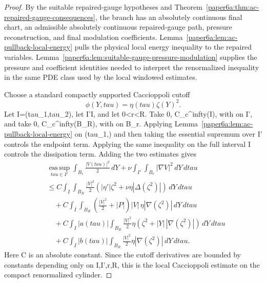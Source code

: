 \documentclass[11pt]{amsart}
\def\({}%
\def\){}%
\def\tau{tau}%
\def\infty{infty}%
\theoremstyle{plain}
\theoremstyle{definition}
\theoremstyle{remark}
\begin{document}
\begin{proof}
By the suitable repaired-gauge hypotheses and
Theorem~\ref{paper6a:thm:ac-repaired-gauge-consequences}, the branch has an
absolutely continuous final chart, an admissible absolutely continuous
repaired-gauge path, pressure reconstruction, and final modulation
coefficients.  Lemma~\ref{paper6a:lem:ac-pullback-local-energy} pulls the physical
local energy inequality to the repaired variables.
Lemma~\ref{paper6a:lem:suitable-gauge-pressure-modulation} supplies the pressure and
coefficient identities needed to interpret the renormalized inequality in the
same PDE class used by the local windowed estimates.

Choose a standard compactly supported Caccioppoli cutoff
\[
  \phi(Y,\tau)=\eta(\tau)\zeta(Y)^2.
\]
Let \(I=(\tau_1,\tau_2)\), let \(I'\Subset I\), and let
\(0<r<R\).  Take \(0\le\eta{}\), \(\eta\in C_c^\infty(I)\), with
\(\eta{}\) on \(I'\), and take \(0\le\zeta{}\),
\(\zeta\in C_c^\infty(B_R)\), with \(\zeta{}\) on \(B_r\).  Applying
Lemma~\ref{paper6a:lem:ac-pullback-local-energy} on \((\tau_1,\sigma)\) and
then taking the essential supremum over \(\sigma\in I'\) controls the endpoint
term.  Applying the same inequality on the full interval \(I\) controls the
dissipation term.  Adding the two estimates gives
\[
\begin{aligned}
&\operatorname*{ess\,sup}_{\tau\in I'}
  \int_{B_r}\frac{|V(\tau)|^2}{2}\,dY
  +\nu\int_{I'}\int_{B_r}|\nabla V|^2\,dY\,d\tau \\
&\le C
\int_I\int_{B_R}\frac{|V|^2}{2}
   \left(|\eta'|\zeta^2+\nu\eta|\Delta(\zeta^2)|\right)\,dY\,d\tau \\
&\quad
+C\int_I\int_{B_R}
   \left(\frac{|V|^2}{2}+|P|\right)|V|\,\eta|\nabla(\zeta^2)|\,dY\,d\tau\\
&\quad
+C\int_I |a(\tau)|
  \int_{B_R}\frac{|V|^2}{2}\eta
    \left(\zeta^2+|Y|\,|\nabla(\zeta^2)|\right)\,dY\,d\tau\\
&\quad
+C\int_I |b(\tau)|
  \int_{B_R}\frac{|V|^2}{2}\eta|\nabla(\zeta^2)|\,dY\,d\tau .
\end{aligned}
\]
Here \(C\) is an absolute constant.  Since the cutoff derivatives are bounded
by constants depending only on \(I,I',r,R\), this is the local Caccioppoli
estimate on the compact renormalized cylinder.


\end{proof}
\end{document}
